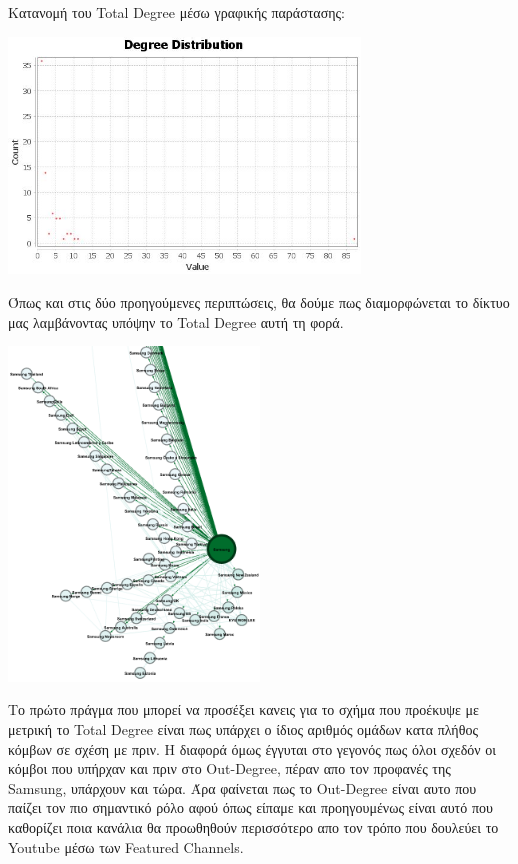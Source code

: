 \documentclass[12pt]{article}
\begin{document}
	\newpage
	Κατανομή του Total Degree μέσω γραφικής παράστασης:
	\begin{center}
		\includegraphics[width=0.7\textwidth]{photos-files/section6/total-degree_graphical.JPG}
	\end{center}
	Όπως και στις δύο προηγούμενες περιπτώσεις, θα δούμε πως διαμορφώνεται το δίκτυο μας λαμβάνοντας υπόψην το Total Degree αυτή τη φορά.
	\begin{center}
		\includegraphics[width=0.5\textwidth]{photos-files/section6/total-degree_RE-layout.png}
	\end{center}
	\par
	Το πρώτο πράγμα που μπορεί να προσέξει κανεις για το σχήμα που προέκυψε με μετρική το Total Degree είναι πως υπάρχει ο ίδιος αριθμός ομάδων κατα πλήθος κόμβων σε σχέση με πριν. Η διαφορά όμως έγγυται στο γεγονός πως όλοι σχεδόν οι κόμβοι που υπήρχαν και πριν στο Out-Degree, πέραν απο τον προφανές της Samsung, υπάρχουν και τώρα. Άρα φαίνεται πως το Out-Degree είναι αυτο που παίζει τον πιο σημαντικό ρόλο αφού όπως είπαμε και προηγουμένως είναι αυτό που καθορίζει ποια κανάλια θα προωθηθούν περισσότερο απο τον τρόπο που δουλεύει το Youtube μέσω των Featured Channels.
	\vspace{12pt}
	\label{chap:degree_measures_6}
	
\end{document}
